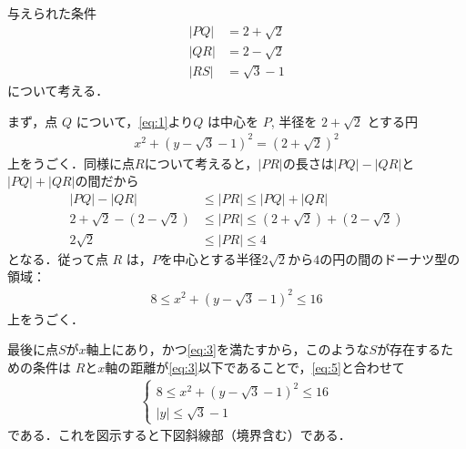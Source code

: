 \documentclass[../../main.tex]{subfiles}
\begin{document}
与えられた条件
\begin{align}
  |PQ| &= 2+\sqrt{2} \label{eq:1}\\
  |QR| &= 2-\sqrt{2} \label{eq:2}\\
  |RS| &= \sqrt{3} -1\label{eq:3}
\end{align}
について考える．

まず，点 $Q$ について，\cref{eq:1}より$Q$ は中心を $P$, 半径を $2+\sqrt{2}$ とする円
\begin{align}
  x^2 + (y - \sqrt{3} - 1)^2 = (2 + \sqrt{2})^2 \label{eq:4}
\end{align}
上をうごく．同様に点$R$について考えると，$|PR|$の長さは$|PQ|-|QR|$と$|PQ|+|QR|$の間だから
\begin{align}
  |PQ|-|QR| &\le |PR| \le |PQ|+|QR| \\
  2+\sqrt{2} - (2-\sqrt{2}) &\le |PR| \le (2+\sqrt{2}) + (2-\sqrt{2}) \\
  2\sqrt{2} &\le |PR| \le 4
\end{align}
となる．従って点 $R$ は，$P$を中心とする半径$2\sqrt{2}$から$4$の円の間のドーナツ型の領域：
\begin{align}
  8 \le x^2 + (y - \sqrt{3} - 1)^2 \le 16 \label{eq:5}
\end{align}
上をうごく．

最後に点$S$が$x$軸上にあり，かつ\cref{eq:3}を満たすから，このような$S$が存在するための条件は
$R$と$x$軸の距離が\cref{eq:3}以下であることで，\cref{eq:5}と合わせて
\begin{align}
  \begin{cases}
    8 \le x^2 + (y - \sqrt{3} - 1)^2 \le 16 \\
    |y| \le \sqrt{3} -1
  \end{cases}
\end{align}
である．これを図示すると下図斜線部（境界含む）である．
\end{document}
